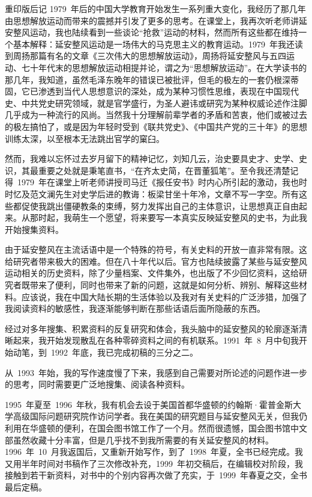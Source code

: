 \begin{pre-post-text}{重印版后记}
1979~年后的中国大学教育开始发生一系列重大变化，我经历了那几年由思想解放运动而带来的震撼并引发了更多的思考。在课堂上，我再次听老师讲延安整风运动，我也陆续看到一些谈论“抢救”运动的材料，然而所有这些都在维持一个基本解释：延安整风运动是一场伟大的马克思主义的教育运动。1979~年我还读到周扬那篇有名的文章《三次伟大的思想解放运动》，周扬将延安整风与五四运动、七十年代末的思想解放运动相提并论，谓之为“思想解放运动”。在大学读书的那几年，我知道，虽然毛泽东晚年的错误已被批评，但毛的极左的一套仍根深蒂固，它已渗透到当代人思想意识的深处，成为某种习惯性思维，表现在中国现代史、中共党史研究领域，就是官学盛行，为圣人避讳或研究为某种权威论述作注脚几乎成为一种流行的风尚。当然我十分理解前辈学者的矛盾和苦衷，他们或被过去的极左搞怕了，或是因为年轻时受到《联共党史》、《中国共产党的三十年》的思想训练太深，以至根本无法跳出官学的窠臼。

然而，我难以忘怀过去岁月留下的精神记忆，刘知几云，治史要具史才、史学、史识，其最重要之处就是秉笔直书，“在齐太史简，在晋董狐笔”。至令我还清楚记得~1979~年在课堂上听老师讲授司马迁《报任安书》时内心所引起的激动，我也时时忆及范文澜先生对史学后进的教诲：板梁甘坐十年冷，文章不写一字空。所有这些都促使我跳出僵硬教条的束缚，努力发挥出自己的主体意识，让思想真正自由起来。从那时起，我萌生一个愿望，将来要写一本真实反映延安整风的史书，为此我开始搜集资料。

由于延安整风在主流话语中是一个特殊的符号，有关史料的开放一直非常有限。这给研究者带来极大的困难。但在八十年代以后。官方也陆续披露了某些与延安整风运动相关的历史资料，除了少量档案、文件集外，也出版了不少回忆资料，这给研究者既带来了便利，同时也带来了新的问题，这就是如何分析、辨别、解释这些材料。应该说，我在中国大陆长期的生活体验以及我对有关史料的广泛涉猎，加强了我阅读资料的敏感性，我逐渐能够判断在那些话语后面所隐蔽的东西。

经过对多年搜集、积累资料的反复研究和体会，我头脑中的延安整风的轮廓逐渐清晰起来，我开始发现散乱在各种零碎资料之间的有机联系。1991~年~8~月中旬我开始动笔，到~1992~年底，我已完成初稿的三分之二。

从~1993~年始，我的写作速度慢了下来，我感到自己需要对所论述的问题作进一步的思考，同时需要更广泛地搜集、阅读各种资料。

1995~年夏至~1996~年秋，我有机会去设于美国首都华盛顿的约翰斯·霍普金斯大学高级国际问题研究院作访问学者。我在美国的研究题目与延安整风无关，但我仍利用在华盛顿的便利，在国会图书馆工作了一个月。然而很遗憾，国会图书馆中文部虽然收藏十分丰富，但是几乎找不到我所需要的有关延安整风的材料。1996~年~10~月我返国后，又重新开始写作，到了~1998~年夏，全书已经完成。我又用半年时间对书稿作了三次修改补充，1999~年初交稿后，在编辑校对阶段，我接触到若干新资料，对书中的个别内容再次做了充实，于~1999~年春夏之交，全书最后定稿。


\end{pre-post-text}

